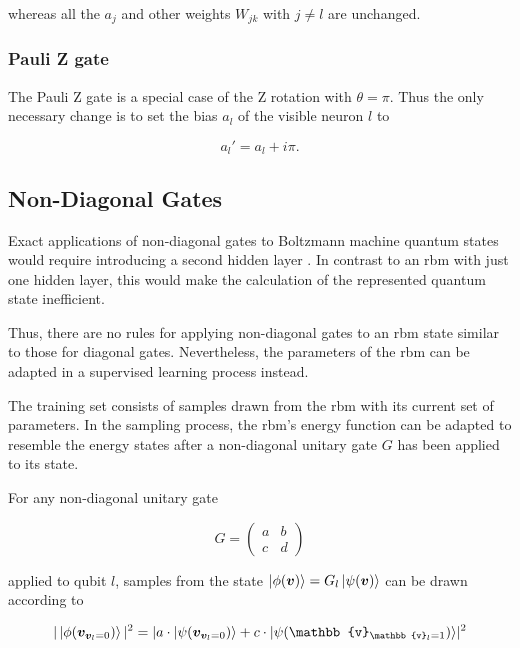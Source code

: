 whereas all the $a_{j}$ and other weights $W_{jk}$ with $j \neq l$ are unchanged.

\subsubsection{Pauli Z gate}
The Pauli Z gate is a special case of the Z rotation with $\theta = \pi$. Thus the 
only necessary change is to set the bias $a_l$ of the visible neuron $l$ to

\begin{equation}
    a_{l}\prime = a_{l} + i \pi.
\end{equation}

\subsection{Non-Diagonal Gates}

Exact applications of non-diagonal gates to Boltzmann machine quantum states would require introducing a second hidden layer \cite{carleo2018constructing}. In contrast to an \gls{rbm} with just one hidden layer, this would make the calculation of the represented quantum state inefficient.

Thus, there are no rules for applying non-diagonal gates to an \gls{rbm} state similar to those for diagonal gates. Nevertheless, the parameters of the \gls{rbm} can be adapted in a 
supervised learning process instead.

The training set consists of samples drawn from the \gls{rbm} with its current set of parameters. In the sampling process, the \gls{rbm}'s energy function can be adapted to resemble the energy states after a non-diagonal unitary gate $ G $ has been applied to its state.

For any non-diagonal unitary gate

\begin{equation}
    G =  \begin{pmatrix}
        a & b \\
        c & d
    \end{pmatrix}
\end{equation}

applied to qubit $l$, samples from the state $\ket{\phi(\bm{v})} = G_l\ket{\psi(\bm{v})}$ can be drawn according to 

\begin{equation}
    \label{eq:prob1}
    | \ket{\phi(\bm{v}_{\bm{v}_l = 0})} |^2 = 
    \lvert  a \cdot \ket{\psi(\bm{v}_{\bm{v}_l = 0})} +
            c \cdot \ket{\psi(\mathbb{v}_{\mathbb{v}_l = 1})}
    \rvert^2
\end{equation}

